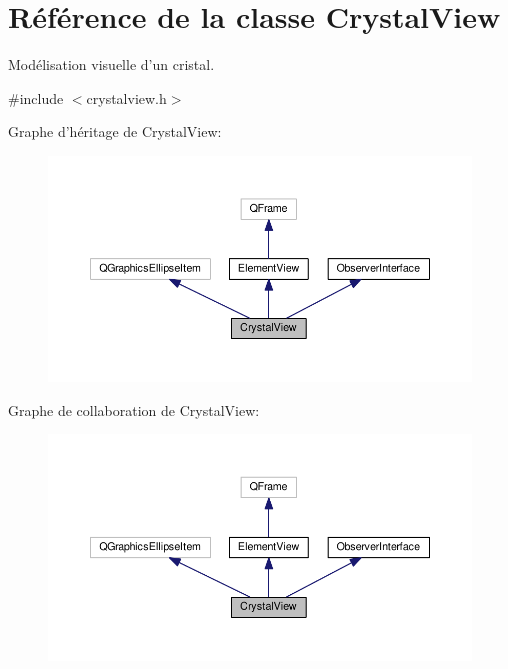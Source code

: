 \hypertarget{classCrystalView}{\section{Référence de la classe Crystal\+View}
\label{classCrystalView}
}


Modélisation visuelle d’un cristal.  




{\ttfamily \#include $<$crystalview.\+h$>$}



Graphe d'héritage de Crystal\+View\+:\nopagebreak
\begin{figure}[H]
\begin{center}
\leavevmode
\includegraphics[width=350pt]{d8/d3c/classCrystalView__inherit__graph}
\end{center}
\end{figure}


Graphe de collaboration de Crystal\+View\+:\nopagebreak
\begin{figure}[H]
\begin{center}
\leavevmode
\includegraphics[width=350pt]{d0/d09/classCrystalView__coll__graph}
\end{center}
\end{figure}

